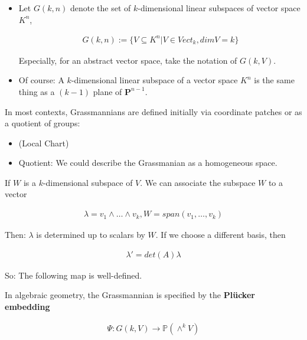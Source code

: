 \documentclass[Total.tex]{subfiles}
\begin{document}
		\begin{Def}
			\begin{itemize}
				\item Let $G(k,n)$ denote the set of $k$-dimensional linear subspaces of vector space $K^n$,
				
				\begin{gather*}
					G(k,n):=\{V\subseteq K^n|V\in Vect_k,dimV=k\}
				\end{gather*}
				
				Especially, for an abstract vector space, take the notation of $G(k,V)$. 
				
				\item Of course: A $k$-dimensional linear subspace of a vector space $K^n$ is the same thing as a $(k-1)$ plane of $\mathbf{P}^{n-1}$. 
			\end{itemize}
		\end{Def}
		
		In most contexts, Grassmannians are defined initially via coordinate patches or as a quotient of groups:
		
		\begin{itemize}
			\item (Local Chart)
			
			\item Quotient: We could describe the Grassmanian as a homogeneous space. 
		\end{itemize}
		
		If $W$ is a $k$-dimensional subspace of $V$. We can associate the subspace $W$ to a vector
		
		\begin{gather*}
			\lambda=v_1\wedge\dots\wedge v_k,W=span(v_1,\dots,v_k)
		\end{gather*}
		
		Then: $\lambda$ is determined up to scalars by $W$. If we choose a different basis, then 
		
		\begin{gather*}
			\lambda'=det(A)\lambda
		\end{gather*}
		
		So: The following map is well-defined.
		
		\begin{Def}
			In algebraic geometry, the Grassmannian is specified by the \textbf{Plücker embedding}
			
			\begin{gather*}
				\Psi:G(k,V)\rightarrow \mathbb{P}(\wedge^k V)
			\end{gather*}
		\end{Def}
		
\end{document}
